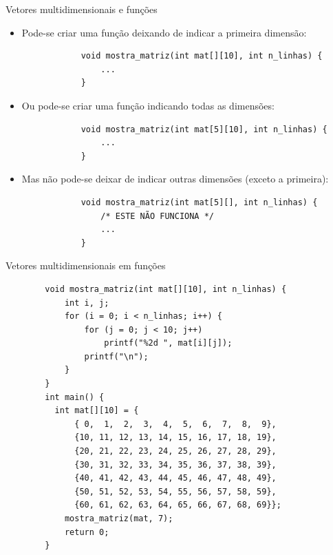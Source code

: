 \documentclass[handout]{beamer}
\begin{document}
\begin{frame}[fragile]{Vetores multidimensionais e funções}

    \begin{itemize}[<+->]
        \item Pode-se criar uma função deixando de indicar a primeira dimensão:
        \begin{verbatim}
            void mostra_matriz(int mat[][10], int n_linhas) {
                ...
            }
        \end{verbatim}

        \item Ou pode-se criar uma função indicando todas as dimensões:
        \begin{verbatim}
            void mostra_matriz(int mat[5][10], int n_linhas) {
                ...
            }
        \end{verbatim}

        \item Mas não pode-se deixar de indicar outras dimensões (exceto a primeira):
        \begin{verbatim}
            void mostra_matriz(int mat[5][], int n_linhas) {
                /* ESTE NÃO FUNCIONA */
                ...
            }
        \end{verbatim}
    \end{itemize}

\end{frame}

\begin{frame}[fragile]{Vetores multidimensionais em funções}

    \begin{verbatim}
        void mostra_matriz(int mat[][10], int n_linhas) {
            int i, j;
            for (i = 0; i < n_linhas; i++) {
                for (j = 0; j < 10; j++)
                    printf("%2d ", mat[i][j]);
                printf("\n");
            }
        }
        int main() {
          int mat[][10] = {
              { 0,  1,  2,  3,  4,  5,  6,  7,  8,  9},
              {10, 11, 12, 13, 14, 15, 16, 17, 18, 19},
              {20, 21, 22, 23, 24, 25, 26, 27, 28, 29},
              {30, 31, 32, 33, 34, 35, 36, 37, 38, 39},
              {40, 41, 42, 43, 44, 45, 46, 47, 48, 49},
              {50, 51, 52, 53, 54, 55, 56, 57, 58, 59},
              {60, 61, 62, 63, 64, 65, 66, 67, 68, 69}};
            mostra_matriz(mat, 7);
            return 0;
        }
    \end{verbatim}

\end{frame}
\end{document}
